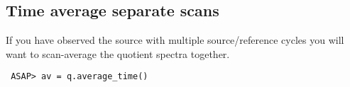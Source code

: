 \documentclass[11pt]{article}
\newcommand{\cmd}[1]{{\tt #1}}
\begin{document}
%
%
%
%
%
%
%
%
%

\subsection{Time average separate scans}

If you have observed the source with multiple
source/reference cycles you will want to scan-average the quotient
spectra together.

\begin{verbatim}
 ASAP> av = q.average_time()
\end{verbatim}
\end{document}
